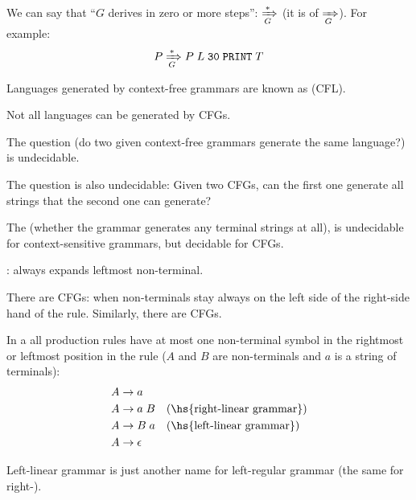 \documentclass{article}
\begin{document}
We can say that ``$G$ derives in zero or more steps'': $\xRightarrow[G]{*}$ (it is  of $\xRightarrow[G]{}$). For example:
\begin{equation*}
\begin{split}
P &\xRightarrow[G]{*} P \; L \; \texttt{30} \; \texttt{PRINT} \; T \\
\end{split}
\end{equation*}
\plush{}

Languages generated by context-free grammars are known as  (CFL).

Not all languages can be generated by CFGs.
\plush{}

The  question (do two given context-free grammars generate the same language?) is undecidable.

The  question is also undecidable: Given two CFGs, can the first one generate all strings that the second one can generate?
\plush{}

The  (whether the grammar generates any terminal strings at all), is undecidable for context-sensitive grammars, but decidable for CFGs.
\plush{}

: always expands leftmost non-terminal.

There are  CFGs: when non-terminals stay always on the left side of the right-side hand of the rule. Similarly, there are  CFGs.
\plush{}


In a  all production rules have at most one non-terminal symbol in the rightmost or leftmost position in the rule
($A$ and $B$ are non-terminals and $a$ is a string of terminals):
\begin{equation*}
\begin{split}
A &\to a \\
A &\to a \; B \quad \text{(\hs{right-linear grammar})} \\
A &\to B \; a \quad \text{(\hs{left-linear grammar})} \\
A &\to \epsilon \\
\end{split}
\end{equation*}
\plush{}

Left-linear grammar is just another name for left-regular grammar (the same for right-).
\plush{}
\end{document}
